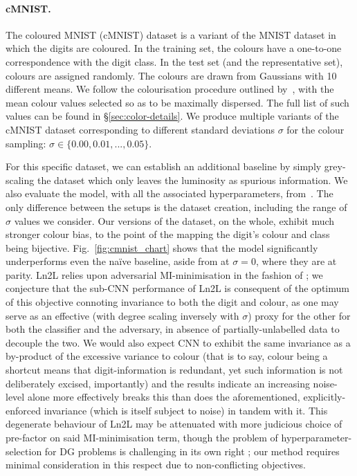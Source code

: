 \paragraph{cMNIST.}
%
The coloured MNIST (cMNIST) dataset is a variant of the MNIST dataset in which the digits are
coloured.
%
In the training set, the colours have a one-to-one correspondence with the digit class.
%
In the test set (and the representative set), colours are assigned randomly.
%
The colours are drawn from Gaussians with 10 different means.
%
We follow the colourisation procedure outlined by~\citet{kim2019learning}, with the mean colour
values selected so as to be maximally dispersed.
%
The full list of such values can be found in \S\ref{sec:color-details}.
%
We produce multiple variants of the cMNIST dataset corresponding to different standard deviations
$\sigma$ for the colour sampling: $\sigma \in \{0.00, 0.01, ..., 0.05 \}$.

For this specific dataset, we can establish an additional baseline by simply grey-scaling the
dataset which only leaves the luminosity as spurious information.
%
We also evaluate the model, with all the associated hyperparameters, from~\citet{kim2019learning}.
%
The only difference between the setups is the dataset creation, including the range of \(\sigma\)
values we consider.
%
Our versions of the dataset, on the whole, exhibit much stronger colour bias, to the point of the
mapping the digit's colour and class being bijective. 
%
Fig.~\ref{fig:cmnist_chart} shows that the model significantly underperforms even the na\"ive
baseline, aside from at \(\sigma = 0\), where they are at parity.
%
Ln2L relies upon adversarial \ac{MI}-minimisation in the fashion of \citet{ganin2016domain}; we
conjecture that the sub-\ac{CNN} performance of Ln2L is consequent of the optimum of this objective
connoting invariance to both the digit and colour, as one may serve as an effective (with degree
scaling inversely with \(\sigma\)) proxy for the other for both the classifier and the adversary,
in absence of partially-unlabelled data to decouple the two.
%
We would also expect \ac{CNN} to exhibit the same invariance as a by-product of the excessive
variance to colour (that is to say, colour being a shortcut means that digit-information is
redundant, yet such information is not deliberately excised, importantly) and the results indicate
an increasing noise-level alone more effectively breaks this than does the aforementioned,
explicitly-enforced invariance (which is itself subject to noise) in tandem with it.
%
This degenerate behaviour of Ln2L may be attenuated with more judicious choice of pre-factor on
said \ac{MI}-minimisation term, though the problem of hyperparameter-selection for \ac{DG} problems
is challenging in its own right \citep{gulrajani2020search}; our method requires minimal
consideration in this respect due to non-conflicting objectives.

